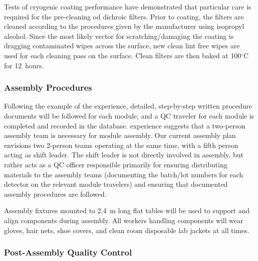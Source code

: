 Tests of cryogenic coating performance have demonstrated that particular care is required for the pre-cleaning od dichroic filters.  Prior to coating, the filters are cleaned according to the procedures given by the manufacturer using isopropyl alcohol. Since the most likely vector for scratching/damaging the coating is dragging contaminated wipes across the surface, new clean lint free wipes are used for each  cleaning pass on the surface. Clean filters are then baked at 100$^\circ$C for \SI{12}{hours}. 


\subsubsection{Assembly Procedures}

Following the example of the  experience, detailed, step-by-step written procedure documents will be followed for each module, and a QC traveler for each module is completed and recorded in the database.   experience suggests that a two-person assembly team is necessary for module assembly. 
Our current assembly plan envisions two 2-person teams operating at the same time, with a fifth person acting as shift leader.  The shift leader is not directly involved in assembly, but rather acts as a QC officer responsible primarily for ensuring distributing materials to the assembly teams (documenting the batch/lot numbers for each detector on the relevant module travelers) and ensuring that documented assembly procedures are followed.

Assembly fixtures mounted to \SI{2.4}{m} long flat tables will be used to support and align  components during assembly.  All workers handling  components will wear gloves, hair nets, shoe covers, and clean room disposable lab jackets at all times.

\subsubsection{Post-Assembly Quality Control}

